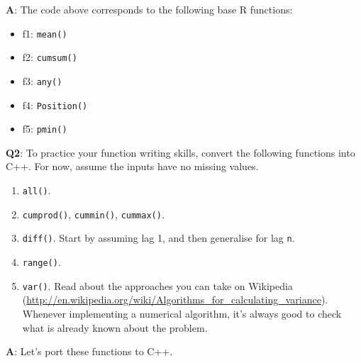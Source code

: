 \documentclass[
]{krantz}
\providecommand{\tightlist}{%
  \setlength{\itemsep}{0pt}\setlength{\parskip}{0pt}}
\renewcommand{\href}[2]{#2 (\url{#1})}
\begin{document}
\textbf{{A}}: The code above corresponds to the following base R functions:

\begin{itemize}
\tightlist
\item
  f1: \texttt{mean()}\\
\item
  f2: \texttt{cumsum()}\\
\item
  f3: \texttt{any()}
\item
  f4: \texttt{Position()}
\item
  f5: \texttt{pmin()}
\end{itemize}

\textbf{{Q2}}: To practice your function writing skills, convert the following functions into C++. For now, assume the inputs have no missing values.

\begin{enumerate}
\def\labelenumi{\arabic{enumi}.}
\item
  \texttt{all()}.
\item
  \texttt{cumprod()}, \texttt{cummin()}, \texttt{cummax()}.
\item
  \texttt{diff()}. Start by assuming lag 1, and then generalise for lag \texttt{n}.
\item
  \texttt{range()}.
\item
  \texttt{var()}. Read about the approaches you can take on \href{http://en.wikipedia.org/wiki/Algorithms_for_calculating_variance}{Wikipedia}. Whenever implementing a numerical algorithm, it's always good to check what is already known about the problem.
\end{enumerate}

\textbf{{A}}: Let's port these functions to C++.
\end{document}
